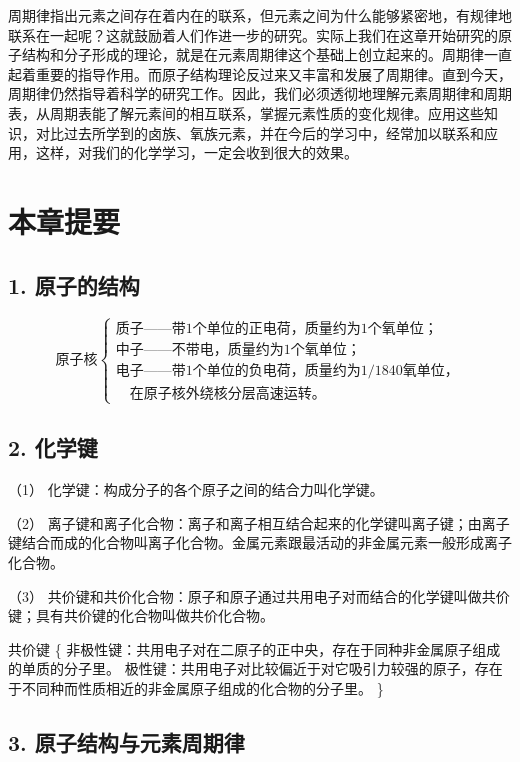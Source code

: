 周期律指出元素之间存在着内在的联系，但元素之间为什么能够紧密地，有规律地联系在一起呢？这就鼓励着人们作进一步的研究。实际上我们在这章开始研究的原子结构和分子形成的理论，就是在元素周期律这个基础上创立起来的。周期律一直起着重要的指导作用。而原子结构理论反过来又丰富和发展了周期律。直到今天，周期律仍然指导着科学的研究工作。因此，我们必须透彻地理解元素周期律和周期表，从周期表能了解元素间的相互联系，掌握元素性质的变化规律。应用这些知识，对比过去所学到的卤族、氧族元素，并在今后的学习中，经常加以联系和应用，这样，对我们的化学学习，一定会收到很大的效果。

\section{本章提要}

\subsection{1. 原子的结构}

\[
\text{原子核}
\left\{
\begin{array}{l}
\text{质子}——\text{带}1\text{个单位的正电荷，质量约为}1\text{个氧单位；} \\
\text{中子}——\text{不带电，质量约为}1\text{个氧单位；} \\
\text{电子}——\text{带}1\text{个单位的负电荷，质量约为}1/1840\text{氧单位，} \\
\quad\text{在原子核外绕核分层高速运转。}
\end{array}
\right.
\]

\subsection{2. 化学键}

（1） 化学键：构成分子的各个原子之间的结合力叫化学键。

（2）
离子键和离子化合物：离子和离子相互结合起来的化学键叫离子键；由离子键结合而成的化合物叫离子化合物。金属元素跟最活动的非金属元素一般形成离子化合物。

（3）
共价键和共价化合物：原子和原子通过共用电子对而结合的化学键叫做共价键；具有共价键的化合物叫做共价化合物。

共价键 \{
非极性键：共用电子对在二原子的正中央，存在于同种非金属原子组成的单质的分子里。
极性键：共用电子对比较偏近于对它吸引力较强的原子，存在于不同种而性质相近的非金属原子组成的化合物的分子里。
\}

\subsection{3. 原子结构与元素周期律}

